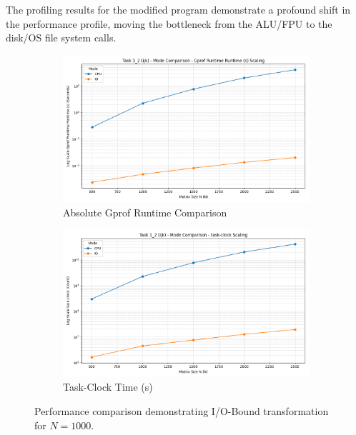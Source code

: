 \documentclass[11pt, a4paper]{article}
\begin{document}
The profiling results for the modified program demonstrate a profound shift in the performance profile, moving the bottleneck from the ALU/FPU to the disk/OS file system calls.
\begin{figure}[h] %
    \centering
    \begin{subfigure}[b]{0.48\textwidth}
        \centering
        \includegraphics[width=\textwidth]{plots/task_1_2_(ijk)_-_mode_comparison_-__gprof_runtime.png}
        \caption{Absolute Gprof Runtime Comparison}
        \label{fig:t2_gprof_abs}
    \end{subfigure}
    \hfill
    \begin{subfigure}[b]{0.48\textwidth}
        \centering
        \includegraphics[width=\textwidth]{plots/task_1_2_(ijk)_-_mode_comparison_-__task-clock.png}
        \caption{Task-Clock Time (s)}
        \label{fig:t2_task_clock}
    \end{subfigure}
    \caption{Performance comparison demonstrating I/O-Bound transformation for $N=1000$.}
\end{figure}
\end{document}
